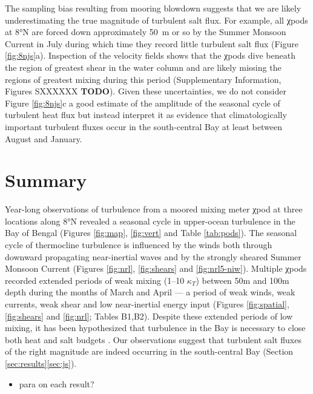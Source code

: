 \documentclass[twocol]{ametsoc}
\begin{document}
The sampling bias resulting from mooring blowdown suggests that we are likely underestimating the true magnitude of turbulent salt flux.
For example, all χpods at 8°N are forced down approximately \SI{50}{m} or so by the Summer Monsoon Current in July during which time they record little turbulent salt flux (Figure \ref{fig:8njs}a).
Inspection of the velocity fields shows that the χpods dive beneath the region of greatest shear in the water column and are likely missing the regions of greatest mixing during this period (Supplementary Information, Figures SXXXXXX \textbf{TODO}).
Given these uncertainties, we do not consider Figure \ref{fig:8njs}c a good estimate of the amplitude of the seasonal cycle of turbulent heat flux but instead interpret it as evidence that climatologically important turbulent fluxes occur in the south-central Bay at least between August and January.

\section{Summary}
\label{sec:org3230bcc}

Year-long observations of turbulence from a moored mixing meter χpod at three locations along 8°N revealed a seasonal cycle in upper-ocean turbulence in the Bay of Bengal (Figures \ref{fig:map}, \ref{fig:vert} and Table \ref{tab:pods}).
The seasonal cycle of thermocline turbulence is influenced by the winds both through downward propagating near-inertial waves and by the strongly sheared Summer Monsoon Current (Figures \ref{fig:nrl}, \ref{fig:shears} and \ref{fig:nrl5-niw}).
Multiple χpods recorded extended periods of weak mixing (1--10 \(κ_T\)) between 50m and 100m depth during the months of March and April --- a period of weak winds, weak currents, weak shear and low near-inertial energy input (Figures \ref{fig:spatial}, \ref{fig:shears} and \ref{fig:nrl}; Tables B1,B2).
Despite these extended periods of low mixing, it has been hypothesized that turbulence in the Bay is necessary to close both heat and salt budgets \citep{Shenoi2002,Vinayachandran2013,Wilson2016a}.
Our observations suggest that turbulent salt fluxes of the right magnitude are indeed occurring in the south-central Bay (Section \ref{sec:results}\ref{sec:js}).

\begin{itemize}
\item para on each result?
\end{itemize}
\end{document}
